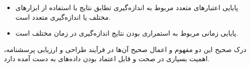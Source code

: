 \documentclass[a4paper,10pt]{article}
\begin{document}
\begin{enumerate}
\begin{itemize}
\begin{itemize}
                \item پایایی اعتبارهای متعدد مربوط به اندازه‌گیری تطابق نتایج با استفاده از ابزارهای مختلف یا اندازه‌گیری متعدد است.

                \item پایایی زمانی مربوط به استمراری بودن نتایج اندازه‌گیری در زمان مختلف است.

            \end{itemize}

        \end{itemize}

    \end{enumerate}

    درک صحیح این دو مفهوم و اعمال صحیح آن‌ها در فرآیند طراحی و ارزیابی پرسشنامه، اهمیت بسیاری در صحت و قابل اعتماد بودن داده‌های به دست آمده دارد.
\end{document}
